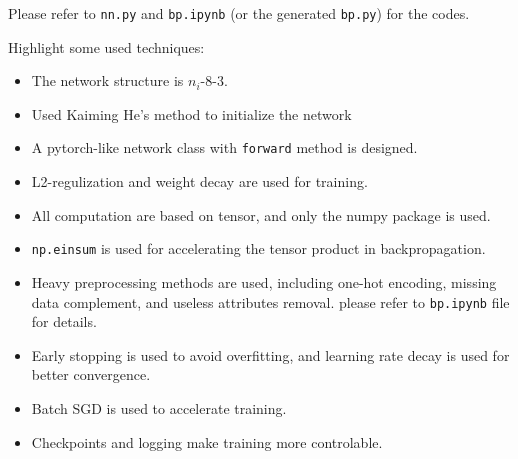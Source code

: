 \documentclass[a4paper, 11pt]{article}
\begin{document}
Please refer to \verb'nn.py' and \verb'bp.ipynb' (or the generated \verb'bp.py') for the codes.

Highlight some used techniques:
\begin{itemize}
    \item The network structure is $n_i$-$8$-$3$.
    \item Used Kaiming He's method to initialize the network
    \item A pytorch-like network class with \verb'forward' method is designed.
    \item L2-regulization and weight decay are used for training.
    \item All computation are based on tensor, and only the numpy package is used.
    \item \verb'np.einsum' is used for accelerating the tensor product in backpropagation.
    \item Heavy preprocessing methods are used, including one-hot encoding, missing data complement, and useless attributes removal. please refer to \verb'bp.ipynb' file for details.
    \item Early stopping is used to avoid overfitting, and learning rate decay is used for better convergence.
    \item Batch SGD is used to accelerate training.
    \item Checkpoints and logging make training more controlable.
\end{itemize}
\end{document}
